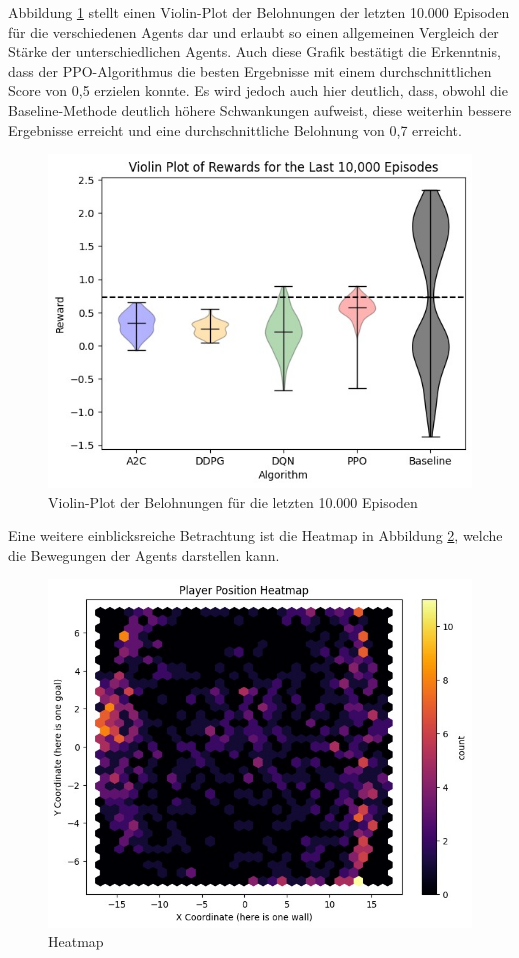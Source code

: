 \documentclass[twocolumn]{webofc}
\begin{document}
Abbildung \ref{fig:bild2} stellt einen Violin-Plot der Belohnungen der letzten 10.000 Episoden für die verschiedenen Agents dar und erlaubt so einen allgemeinen Vergleich der Stärke der unterschiedlichen Agents. Auch diese Grafik bestätigt die Erkenntnis, dass der \ac{PPO}-Algorithmus die besten Ergebnisse mit einem durchschnittlichen Score von 0,5 erzielen konnte. Es wird jedoch auch hier deutlich, dass, obwohl die Baseline-Methode deutlich höhere Schwankungen aufweist, diese weiterhin bessere Ergebnisse erreicht und eine durchschnittliche Belohnung von 0,7 erreicht.

\begin{figure}[h]
	\centering
   \includegraphics[width=\columnwidth]{img/example2.jpeg}
	\caption{Violin-Plot der Belohnungen für die letzten 10.000 Episoden}
	\label{fig:bild2}
\end{figure}

Eine weitere einblicksreiche Betrachtung ist die Heatmap in Abbildung \ref{fig:bild3}, welche die Bewegungen der Agents darstellen kann.
\begin{figure}[h]
	\centering
	\includegraphics[width=\columnwidth]{img/example3.jpeg}
	\caption{Heatmap}
	\label{fig:bild3}
\end{figure}
\end{document}
